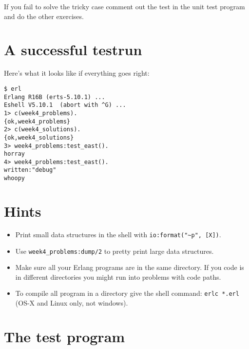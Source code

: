 \documentclass[12pt]{hitec}
\begin{document}
If you fail to solve the tricky case comment out the test in the unit
test program and do the other exercises.

\section{A successful testrun}

Here's what it looks like if everything goes right:

\begin{Verbatim}[frame=single]
$ erl
Erlang R16B (erts-5.10.1) ...
Eshell V5.10.1  (abort with ^G) ...
1> c(week4_problems).
{ok,week4_problems}
2> c(week4_solutions).
{ok,week4_solutions}
3> week4_problems:test_east().
horray
4> week4_problems:test_east().
written:"debug"
whoopy
\end{Verbatim}

\section{Hints}

\begin{itemize}

\item Print small data structures in the shell with \verb+io:format("~p", [X])+.

\item Use \verb+week4_problems:dump/2+ to pretty print large data structures.

\item Make sure all your Erlang programs are in the same directory.
If you code is in different directories you might run into problems with code paths.

\item To compile all program in a directory give the shell command:
\verb+erlc *.erl+ (OS-X and Linux only, not windows).
\end{itemize}


\section{The test program}

\end{document}
